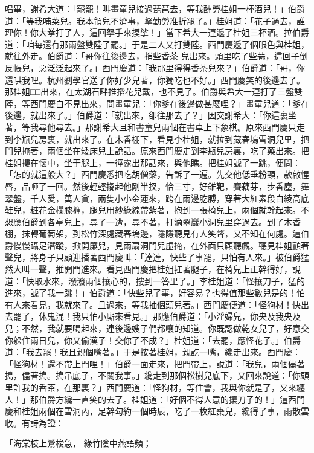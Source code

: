 唱畢，謝希大道：「罷罷！叫畫童兒接過琵琶去，等我酬勞桂姐一杯酒兒！」伯爵道：「等我哺菜兒。我本領兒不濟事，拏勤勞准折罷了。」桂姐道：「花子過去，誰理你！你大拳打了人，這回拏手來摸挲！」當下希大一連遞了桂姐三杯酒。拉伯爵道：「咱每還有那兩盤雙陸了罷。」于是二人又打雙陸。西門慶遞了個眼色與桂姐，就往外走。伯爵道：「哥你往後邊去，捎些香茶 兒出來。頭里吃了些蒜，這回子倒反帳兒，惡泛泛起來了。」西門慶道：「我那里得得香茶兒來？」伯爵道：「哥，你還哄我哩。杭州劉學官送了你好少兒著，你獨吃也不好。」西門慶笑的後邊去了。那桂姐□□出來，在太湖石畔推搯花兒戴，也不見了。伯爵與希大一連打了三盤雙陸，等西門慶白不見出來，問畫童兒：「你爹在後邊做甚麼哩？」畫童兒道：「爹在後邊，就出來了。」伯爵道：「就出來，卻往那去了？」因交謝希大：「你這裏坐著，等我尋他尋去。」那謝希大且和書童兒兩個在書卓上下象棋。原來西門慶只走到李瓶兒房裏，就出來了。在木香棚下，看見李桂姐，就拉到藏春塢雪洞兒里，把門兒掩著，兩個坐在矮床兒上說話。原來西門慶走到李瓶兒房裏，吃了藥出來。把桂姐摟在懷中，坐于腿上，一徑露出那話來，與他瞧。把桂姐諕了一跳，便問：「怎的就這般大？」西門慶悉把吃胡僧藥，告訴了一遍。先交他低垂粉頸，款啟惺唇，品咂了一回。然後輕輕搊起他剛半扠，恰三寸，好錐靶，賽藕芽，步香塵，舞翠盤，千人愛，萬人貪，兩隻小小金蓮來，跨在兩邊肐膊，穿著大紅素段白綾高底鞋兒，粧花金欄膝褲，腿兒用紗綠線帶紮著，抱到一張椅兒上，兩個就幹起來。不想應伯爵到各亭兒上，尋了一遭，尋不著，打滴翠巖小洞兒里穿過去。到了木香棚，抹轉葡萄架，到松竹深處藏春塢邊，隱隱聽見有人笑聲，又不知在何處。這伯爵慢慢躡足潛蹤，掀開簾兒，見兩扇洞門兒虛掩，在外面只顧聽覷。聽見桂姐顫著聲兒，將身子只顧迎播著西門慶叫：「達達，快些了事罷，只怕有人來。」被伯爵猛然大叫一聲，推開門進來。看見西門慶把桂姐扛著腿子，在椅兒上正幹得好，說道：「快取水來，潑潑兩個攘心的，摟到一答里了。」李桂姐道：「怪攘刀子，猛的進來，諕了我一跳！」伯爵道：「快些兒了事，好容易？也得值那些數兒是的！怕有人來看見，我就來了。且過來，等我抽個頭兒著。」西門慶便道：「怪狗材！快出去罷了，休鬼混！我只怕小廝來看見。」那應伯爵道：「小淫婦兒，你央及我央及兒；不然，我就要喝起來，連後邊嫂子們都嚷的知道。你既認做乾女兒了，好意交你躲住兩日兒，你又偷漢子！交你了不成？」桂姐道：「去罷，應怪花子。」伯爵道：「我去罷！我且親個嘴著。」于是按著桂姐，親訖一嘴，纔走出來。西門慶：「怪狗材！還不帶上門哩！」伯爵一面走來，把門帶上，說道：「我兒，兩個儘著搗，儘著搗。搗吊底子，不關我事。」纔走到那個松樹兒底下，又回來說道：「你頭里許我的香茶，在那裏？」西門慶道：「怪狗材，等住會，我與你就是了，又來纏人！」那伯爵方纔一直笑的去了。桂姐道：「好個不得人意的攘刀子的！」這西門慶和桂姐兩個在雪洞內，足幹勾約一個時辰，吃了一枚紅棗兒，纔得了事，雨散雲收。有詩為證：

「海棠枝上鶯梭急，  綠竹陰中燕語頻；

